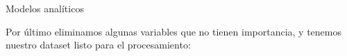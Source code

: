 \documentclass[pdf]{beamer}
\begin{document}
\begin{frame}{Modelos analíticos}
    \scriptsize

    Por último eliminamos algunas variables que no tienen importancia, y tenemos nuestro dataset listo para el procesamiento:


\end{frame}
\end{document}
